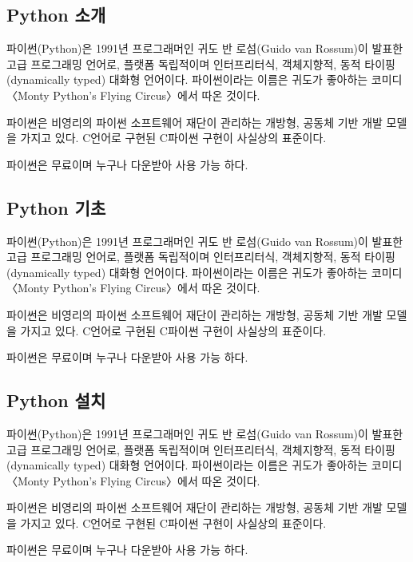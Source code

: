 \subsection{Python 소개}

파이썬(Python)은 1991년 프로그래머인 귀도 반 로섬(Guido van Rossum)이 발표한 고급 프로그래밍 언어로, 플랫폼 독립적이며 인터프리터식, 객체지향적, 동적 타이핑(dynamically typed) 대화형 언어이다. 파이썬이라는 이름은 귀도가 좋아하는 코미디 〈Monty Python's Flying Circus〉에서 따온 것이다.

파이썬은 비영리의 파이썬 소프트웨어 재단이 관리하는 개방형, 공동체 기반 개발 모델을 가지고 있다. C언어로 구현된 C파이썬 구현이 사실상의 표준이다.

파이썬은 무료이며 누구나 다운받아 사용 가능 하다.

\subsection{Python 기초}

파이썬(Python)은 1991년 프로그래머인 귀도 반 로섬(Guido van Rossum)이 발표한 고급 프로그래밍 언어로, 플랫폼 독립적이며 인터프리터식, 객체지향적, 동적 타이핑(dynamically typed) 대화형 언어이다. 파이썬이라는 이름은 귀도가 좋아하는 코미디 〈Monty Python's Flying Circus〉에서 따온 것이다.

파이썬은 비영리의 파이썬 소프트웨어 재단이 관리하는 개방형, 공동체 기반 개발 모델을 가지고 있다. C언어로 구현된 C파이썬 구현이 사실상의 표준이다.

파이썬은 무료이며 누구나 다운받아 사용 가능 하다.


\subsection{Python 설치}

파이썬(Python)은 1991년 프로그래머인 귀도 반 로섬(Guido van Rossum)이 발표한 고급 프로그래밍 언어로, 플랫폼 독립적이며 인터프리터식, 객체지향적, 동적 타이핑(dynamically typed) 대화형 언어이다. 파이썬이라는 이름은 귀도가 좋아하는 코미디 〈Monty Python's Flying Circus〉에서 따온 것이다.

파이썬은 비영리의 파이썬 소프트웨어 재단이 관리하는 개방형, 공동체 기반 개발 모델을 가지고 있다. C언어로 구현된 C파이썬 구현이 사실상의 표준이다.

파이썬은 무료이며 누구나 다운받아 사용 가능 하다.

